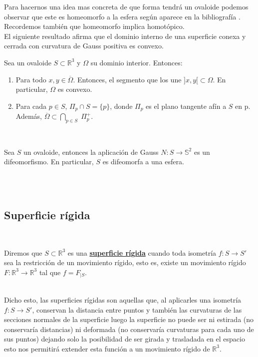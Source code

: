 Para hacernos una idea mas concreta de que forma tendrá un ovaloide podemos observar que este es homeomorfo a la esfera según aparece en la bibliografía \cite{ref1}. Recordemos también que homeomorfo implica homotópico.
${ }$\\

El siguiente resultado afirma que el dominio interno de una superficie conexa y cerrada con curvatura de Gauss positiva es convexo.
${ }$\\

\begin{teorema} \label{teo:hadamard}
	Sea un ovaloide $S \subset \mathbb{R}^3$ y $\Omega$ su dominio interior. Entonces:
	
	\begin{enumerate}
		\item Para todo $x, y \in \overline{\Omega}$. Entonces, el segmento que los une $]x, y[ \subset \Omega$. En particular, $\Omega$ es convexo.
		\item Para cada $p \in S$, $\Pi_p \cap S = \{p\}$, donde $\Pi_p$ es el plano tangente afín a $S$ en p. Además, $\overline{\Omega} \subset \bigcap_{p \in S} \; \Pi^{+}_{p}$.
	\end{enumerate}
\end{teorema}
${ }$\\

\begin{teorema}[Hadamard]
	Sea $S$ un ovaloide, entonces la aplicación de Gauss $N : S \to \mathbb{S}^2$ es un difeomorfismo. En particular, $S$ es difeomorfa a una esfera.
\end{teorema}
${ }$\\


${ }$\\
\subsection{Superficie rígida}
${ }$\\

\begin{definicion}
	Diremos que $S \subset \mathbb{R}^3$ es una \underline{\textbf{superficie rígida}} cuando toda isometría $f : S \to S'$ sea la restricción de un movimiento rígido, esto es, existe un movimiento rígido $F : \mathbb{R}^3 \to \mathbb{R}^3$ tal que $f = F_{|S}$.
\end{definicion}
${ }$\\

Dicho esto, las superficies rígidas son aquellas que, al aplicarles una isometría $f : S \to S'$, conservan la distancia entre puntos y también las curvaturas de las secciones normales de la superficie luego la superficie no puede ser ni estirada (no conservaría distancias) ni deformada (no conservaría curvaturas para cada uno de sus puntos) dejando solo la posibilidad de ser girada y trasladada en el espacio esto nos permitirá extender esta función a un movimiento rígido de $\mathbb{R}^3$.
${ }$\\



